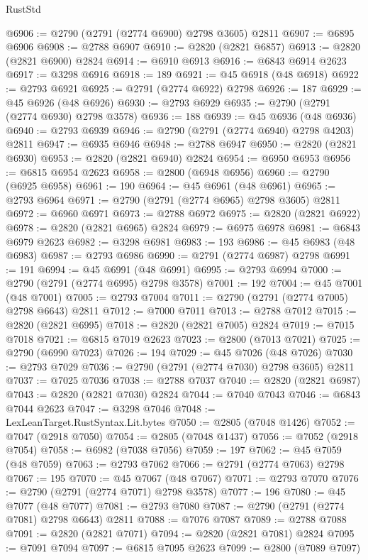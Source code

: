 \begin{lexlean}{RustStd}
\begin{coremodule}
@6906 := @2790 (@2791 (@2774 @6900) @2798 @3605) @2811
@6907 := @6895 @6906
@6908 := @2788 @6907
@6910 := @2820 (@2821 @6857)
@6913 := @2820 (@2821 @6900) @2824
@6914 := @6910 @6913
@6916 := @6843 @6914 @2623
@6917 := @3298 @6916
@6918 := 189
@6921 := @45 @6918 (@48 @6918)
@6922 := @2793 @6921
@6925 := @2791 (@2774 @6922) @2798
@6926 := 187
@6929 := @45 @6926 (@48 @6926)
@6930 := @2793 @6929
@6935 := @2790 (@2791 (@2774 @6930) @2798 @3578)
@6936 := 188
@6939 := @45 @6936 (@48 @6936)
@6940 := @2793 @6939
@6946 := @2790 (@2791 (@2774 @6940) @2798 @4203) @2811
@6947 := @6935 @6946
@6948 := @2788 @6947
@6950 := @2820 (@2821 @6930)
@6953 := @2820 (@2821 @6940) @2824
@6954 := @6950 @6953
@6956 := @6815 @6954 @2623
@6958 := @2800 (@6948 @6956)
@6960 := @2790 (@6925 @6958)
@6961 := 190
@6964 := @45 @6961 (@48 @6961)
@6965 := @2793 @6964
@6971 := @2790 (@2791 (@2774 @6965) @2798 @3605) @2811
@6972 := @6960 @6971
@6973 := @2788 @6972
@6975 := @2820 (@2821 @6922)
@6978 := @2820 (@2821 @6965) @2824
@6979 := @6975 @6978
@6981 := @6843 @6979 @2623
@6982 := @3298 @6981
@6983 := 193
@6986 := @45 @6983 (@48 @6983)
@6987 := @2793 @6986
@6990 := @2791 (@2774 @6987) @2798
@6991 := 191
@6994 := @45 @6991 (@48 @6991)
@6995 := @2793 @6994
@7000 := @2790 (@2791 (@2774 @6995) @2798 @3578)
@7001 := 192
@7004 := @45 @7001 (@48 @7001)
@7005 := @2793 @7004
@7011 := @2790 (@2791 (@2774 @7005) @2798 @6643) @2811
@7012 := @7000 @7011
@7013 := @2788 @7012
@7015 := @2820 (@2821 @6995)
@7018 := @2820 (@2821 @7005) @2824
@7019 := @7015 @7018
@7021 := @6815 @7019 @2623
@7023 := @2800 (@7013 @7021)
@7025 := @2790 (@6990 @7023)
@7026 := 194
@7029 := @45 @7026 (@48 @7026)
@7030 := @2793 @7029
@7036 := @2790 (@2791 (@2774 @7030) @2798 @3605) @2811
@7037 := @7025 @7036
@7038 := @2788 @7037
@7040 := @2820 (@2821 @6987)
@7043 := @2820 (@2821 @7030) @2824
@7044 := @7040 @7043
@7046 := @6843 @7044 @2623
@7047 := @3298 @7046
@7048 := LexLeanTarget.RustSyntax.Lit.bytes
@7050 := @2805 (@7048 @1426)
@7052 := @7047 (@2918 @7050)
@7054 := @2805 (@7048 @1437)
@7056 := @7052 (@2918 @7054)
@7058 := @6982 (@7038 @7056)
@7059 := 197
@7062 := @45 @7059 (@48 @7059)
@7063 := @2793 @7062
@7066 := @2791 (@2774 @7063) @2798
@7067 := 195
@7070 := @45 @7067 (@48 @7067)
@7071 := @2793 @7070
@7076 := @2790 (@2791 (@2774 @7071) @2798 @3578)
@7077 := 196
@7080 := @45 @7077 (@48 @7077)
@7081 := @2793 @7080
@7087 := @2790 (@2791 (@2774 @7081) @2798 @6643) @2811
@7088 := @7076 @7087
@7089 := @2788 @7088
@7091 := @2820 (@2821 @7071)
@7094 := @2820 (@2821 @7081) @2824
@7095 := @7091 @7094
@7097 := @6815 @7095 @2623
@7099 := @2800 (@7089 @7097)

\end{coremodule}
\end{lexlean}
